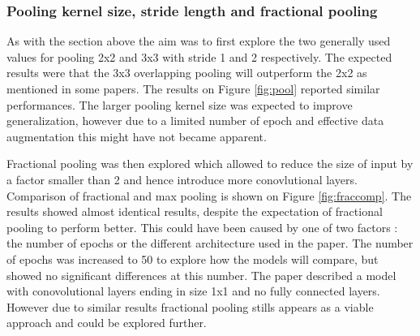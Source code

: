 \documentclass[12pt]{article}
\begin{document}
\subsubsection*{Pooling kernel size, stride length and fractional pooling}

As with the section above the aim was to first explore the two generally used values for pooling 2x2 and 3x3 with stride 1 and 2 respectively. The expected results were that the 3x3 overlapping pooling will outperform the 2x2 as mentioned in some papers\cite{inspiration}\cite{frac}. The results on Figure \ref{fig:pool} reported similar performances. The larger pooling kernel size was expected to improve generalization, however due to a limited number of epoch and effective data augmentation this might have not became apparent. 



Fractional pooling\cite{frac} was then explored which allowed to reduce the size of input by a factor smaller than 2 and hence introduce more conovlutional layers. Comparison of fractional and max pooling is shown on Figure \ref{fig:fraccomp}. The results showed almost identical results, despite the expectation of fractional pooling to perform better. This could have been caused by one of two factors : the number of epochs or the different architecture used in the paper. The number of epochs was increased to 50 to explore how the models will compare, but showed no significant differences at this number. The paper described a model with conovolutional layers ending in size 1x1 and no fully connected layers. However due to similar results fractional pooling stills appears as a viable approach and could be explored further.
\end{document}
